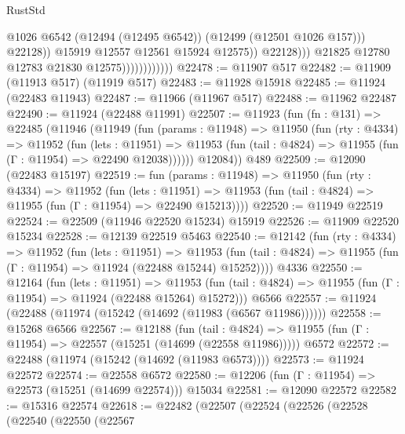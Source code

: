 \begin{lexlean}{RustStd}
\begin{coremodule}
                                            @1026
                                            @6542
                                            (@12494 (@12495 @6542))
                                            (@12499 (@12501 @1026 @157)))
                                          @22128))
                                      @15919
                                      @12557
                                      @12561
                                      @15924
                                      @12575))
                                  @22128)))
                            @21825
                            @12780
                            @12783
                            @21830
                            @12575))))))))))))
@22478 := @11907 @517
@22482 := @11909 (@11913 @517) (@11919 @517)
@22483 := @11928 @15918
@22485 := @11924 (@22483 @11943)
@22487 := @11966 (@11967 @517)
@22488 := @11962 @22487
@22490 := @11924 (@22488 @11991)
@22507 := @11923
    (fun (fn : @131) =>
    @22485
      (@11946
        (@11949
          (fun (params : @11948) =>
          @11950
            (fun (rty : @4334) =>
            @11952
              (fun (lets : @11951) =>
              @11953 (fun (tail : @4824) => @11955 (fun (Γ : @11954) => @22490 @12038))))))
        @12084))
    @489
@22509 := @12090 (@22483 @15197)
@22519 := fun (params : @11948) =>
  @11950
    (fun (rty : @4334) =>
    @11952
      (fun (lets : @11951) =>
      @11953 (fun (tail : @4824) => @11955 (fun (Γ : @11954) => @22490 @15213))))
@22520 := @11949 @22519
@22524 := @22509 (@11946 @22520 @15234) @15919
@22526 := @11909 @22520 @15234
@22528 := @12139 @22519 @5463
@22540 := @12142
    (fun (rty : @4334) =>
    @11952
      (fun (lets : @11951) =>
      @11953 (fun (tail : @4824) => @11955 (fun (Γ : @11954) => @11924 (@22488 @15244) @15252))))
    @4336
@22550 := @12164
    (fun (lets : @11951) =>
    @11953 (fun (tail : @4824) => @11955 (fun (Γ : @11954) => @11924 (@22488 @15264) @15272)))
    @6566
@22557 := @11924 (@22488 (@11974 (@15242 (@14692 (@11983 (@6567 @11986))))))
@22558 := @15268 @6566
@22567 := @12188
    (fun (tail : @4824) => @11955 (fun (Γ : @11954) => @22557 (@15251 (@14699 (@22558 @11986)))))
    @6572
@22572 := @22488 (@11974 (@15242 (@14692 (@11983 @6573))))
@22573 := @11924 @22572
@22574 := @22558 @6572
@22580 := @12206 (fun (Γ : @11954) => @22573 (@15251 (@14699 @22574))) @15034
@22581 := @12090 @22572
@22582 := @15316 @22574
@22618 := @22482
    (@22507
      (@22524
        (@22526
          (@22528
            (@22540
              (@22550
                (@22567

\end{coremodule}
\end{lexlean}
